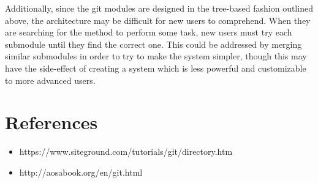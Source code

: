 \documentclass[12pt]{article}
\begin{document}
Additionally, since the git modules are designed in the tree-based fashion outlined above, the architecture may be difficult for new users to comprehend. When they are searching for the method to perform some task, new users must try each submodule until they find the correct one. This could be addressed by merging similar submodules in order to try to make the system simpler, though this may have the side-effect of creating a system which is less powerful and customizable to more advanced users.

\section{References}
\begin{itemize}
\item https://www.siteground.com/tutorials/git/directory.htm
\item http://aosabook.org/en/git.html
\end{itemize}
\end{document}
